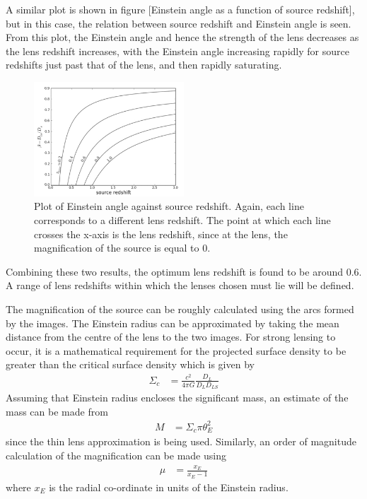 	A similar plot is shown in figure [Einstein angle as a function of source redshift], but in this case, the relation between source redshift and Einstein angle is seen. From this plot, the Einstein angle and hence the strength of the lens decreases as the lens redshift increases, with the Einstein angle increasing rapidly for source redshifts just past that of the lens, and then rapidly saturating.
	\begin{figure}[ht]
		\centering
			\includegraphics[width=0.5\textwidth]{../Images/Einstein_angle_as_a_function_of_source_redshift.png}
		\caption[Einstein angle as a function of source redshift]{\cite{Constraining_source_redshift_distributions} Plot of Einstein angle against source redshift. Again, each line corresponds to a different lens redshift. The point at which each line crosses the x-axis is the lens redshift, since at the lens, the magnification of the source is equal to 0.\label{fig:Einstein_angle_as_a_function_of_source_redshift}}
	\end{figure}

	Combining these two results, the optimum lens redshift is found to be around 0.6. A range of lens redshifts within which the lenses chosen must lie will be defined.

	The magnification of the source can be roughly calculated using the arcs formed by the images. The Einstein radius can be approximated by taking the mean distance from the centre of the lens to the two images. For strong lensing to occur, it is a mathematical requirement for the projected surface density to be greater than the critical surface density which is given by\cite{Critical_surface_density}
	\begin{align}
		\Sigma_c &= \frac{c^2}{4\pi G}\frac{D_L}{D_L D_{LS}}
	\end{align}
	Assuming that Einstein radius encloses the significant mass, an estimate of the mass can be made from
	\begin{align}
		M &= \Sigma_c \pi \theta_E^2
	\end{align}
	since the thin lens approximation is being used. Similarly, an order of magnitude calculation of the magnification can be made using
	\begin{align}
		\mu &= \frac{x_E}{x_E -1}
	\end{align}
	where $x_E$ is the radial co-ordinate in units of the Einstein radius\cite{Lens_mass_estimate}.
